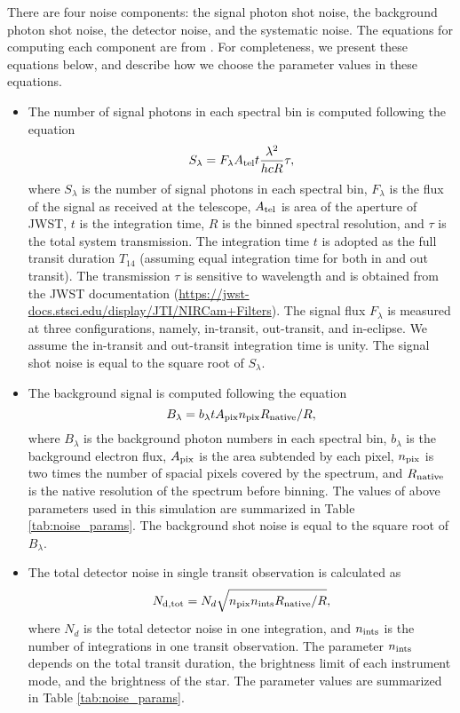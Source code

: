 \documentclass[twocolumn]{aastex61}
\begin{document}
There are four noise components: the signal photon shot noise, the background photon shot noise, the detector noise, and the systematic noise. The equations for computing each component are from \citet{Greene16}. For completeness, we present these equations below, and describe how we choose the parameter values in these equations.  
\begin{itemize}

\item The number of signal photons in each spectral bin is computed following the equation 
\begin{equation}\label{eqn:signal}
S_{\lambda} = F_{\lambda}A_{\rm tel}t\frac{\lambda^2}{hcR}\tau,
\end{equation}
where $S_{\lambda}$ is the number of signal photons in each spectral bin, $F_{\lambda}$ is the flux of the signal as received at the telescope, $A_{\rm tel}$ is area of the aperture of JWST, $t$ is the integration time, $R$ is the binned spectral resolution, and $\tau$ is the total system transmission. The integration time $t$ is adopted as the full transit duration $T_{14}$ (assuming equal integration time for both in and out transit). The transmission $\tau$ is sensitive to wavelength and is obtained from the JWST documentation (\url{https://jwst-docs.stsci.edu/display/JTI/NIRCam+Filters}). The signal flux $F_{\lambda}$ is measured at three configurations, namely, in-transit, out-transit, and in-eclipse. We assume the in-transit and out-transit integration time is unity. The signal shot noise is equal to the square root of $S_{\lambda}$.  

\item The background signal is computed following the equation
\begin{equation}\label{eqn:background}
B_{\lambda} = b_{\lambda}tA_{\rm pix}n_{\rm pix}R_{\rm native}/R, 
\end{equation}
where $B_{\lambda}$ is the background photon numbers in each spectral bin, $b_{\lambda}$ is the background electron flux, $A_{\rm pix}$ is the area subtended by each pixel, $n_{\rm pix}$ is two times the number of spacial pixels covered by the spectrum, and $R_{\rm native}$ is the native resolution of the spectrum before binning. The values of above parameters used in this simulation are summarized in Table \ref{tab:noise_params}. The background shot noise is equal to the square root of $B_{\lambda}$.  

\item The total detector noise in single transit observation is calculated as 
\begin{equation}
N_{\rm d,tot} = N_d\sqrt{n_{\rm pix}n_{\rm ints}R_{\rm native}/R},
\end{equation}
where $N_d$ is the total detector noise in one integration, and $n_{\rm ints}$ is the number of integrations in one transit observation. The parameter $n_{\rm ints}$ depends on the total transit duration, the brightness limit of each instrument mode, and the brightness of the star. The parameter values are summarized in Table \ref{tab:noise_params}.  


\end{itemize}
\end{document}
